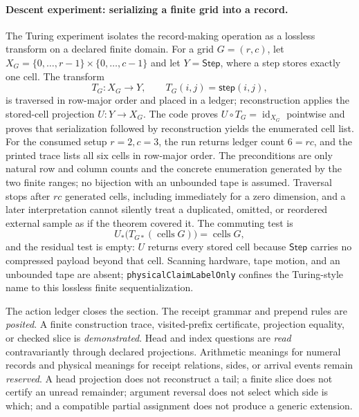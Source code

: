 \paragraph{Descent experiment: serializing a finite grid into a record.}
The Turing experiment isolates the record-making operation as a lossless transform on a declared finite domain.
For a grid \(G=(r,c)\), let \(X_G=\{0,\ldots,r-1\}\times\{0,\ldots,c-1\}\) and let \(Y=\mathsf{Step}\), where a step stores exactly one cell.
The transform
\[
 T_G:X_G\longrightarrow Y,
 \qquad T_G(i,j)=\mathsf{step}(i,j),
\]
is traversed in row-major order and placed in a ledger; reconstruction applies the stored-cell projection \(U:Y\to X_G\).
The code proves \(U\circ T_G=\operatorname{id}_{X_G}\) pointwise and proves that serialization followed by reconstruction yields the enumerated cell list.
For the consumed setup \(r=2,c=3\), the run returns ledger count \(6=r c\), and the printed trace lists all six cells in row-major order.
The preconditions are only natural row and column counts and the concrete enumeration generated by the two finite ranges; no bijection with an unbounded tape is assumed.
Traversal stops after \(r c\) generated cells, including immediately for a zero dimension, and a later interpretation cannot silently treat a duplicated, omitted, or reordered external sample as if the theorem covered it.
The commuting test is
\[
 U_*\bigl(T_{G*}(\operatorname{cells}G)\bigr)=\operatorname{cells}G,
\]
and the residual test is empty: \(U\) returns every stored cell because \(\mathsf{Step}\) carries no compressed payload beyond that cell.
Scanning hardware, tape motion, and an unbounded tape are absent; \texttt{physicalClaimLabelOnly} confines the
Turing-style name to this lossless finite sequentialization.

The action ledger closes the section.  The receipt grammar and prepend rules are \emph{posited}.  A finite construction
trace, visited-prefix certificate, projection equality, or checked slice is \emph{demonstrated}.  Head and index
questions are \emph{read} contravariantly through declared projections.  Arithmetic meanings for numeral records and
physical meanings for receipt relations, sides, or arrival events remain \emph{reserved}.  A head projection does not reconstruct a tail; a finite
slice does not certify an unread remainder; argument reversal does not select which side is which; and a compatible
partial assignment does not produce a generic extension.
